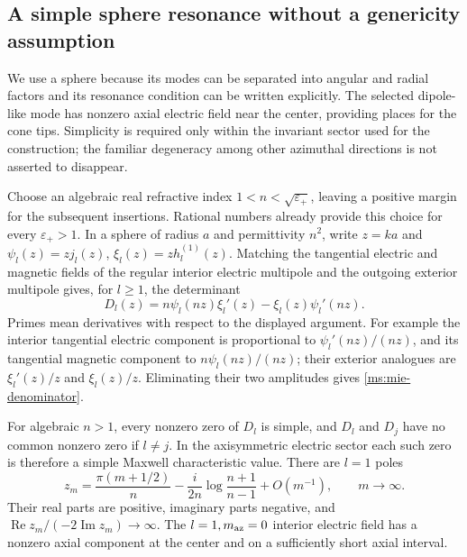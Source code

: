 \subsection{A simple sphere resonance without a genericity assumption}

We use a sphere because its modes can be separated into angular and
radial factors and its resonance condition can be written explicitly.
The selected dipole-like mode has nonzero axial electric field near the
center, providing places for the cone tips.  Simplicity is required only
within the invariant sector used for the construction; the familiar
degeneracy among other azimuthal directions is not asserted to disappear.

Choose an algebraic real refractive index
$1<n<\sqrt{\varepsilon_+}$, leaving a positive margin for the
subsequent insertions.  Rational numbers already provide this
choice for every $\varepsilon_+>1$.  In a sphere of radius $a$ and
permittivity $n^2$, write $z=ka$ and
$\psi_l(z)=zj_l(z)$, $\xi_l(z)=zh_l^{(1)}(z)$.
Matching the tangential electric and magnetic fields of the regular
interior electric multipole and the outgoing exterior multipole
gives, for $l\geq1$, the determinant
\begin{equation}
 D_l(z)=n\psi_l(nz)\xi_l'(z)-\xi_l(z)\psi_l'(nz).
 \label{ms:mie-denominator}
\end{equation}
Primes mean derivatives with respect to the displayed argument.
For example the interior tangential electric component is
proportional to $\psi_l'(nz)/(nz)$, and its tangential magnetic
component to $n\psi_l(nz)/(nz)$; their exterior analogues are
$\xi_l'(z)/z$ and $\xi_l(z)/z$.  Eliminating their two amplitudes
gives \eqref{ms:mie-denominator}.

\begin{lemma}
\label{ms:sphere-simple}
For algebraic $n>1$, every nonzero zero of $D_l$ is simple, and
$D_l$ and $D_j$ have no common nonzero zero if $l\ne j$.
In the axisymmetric electric sector each such zero is therefore a
simple Maxwell characteristic value.  There are $l=1$ poles
\begin{equation}
 z_m=\frac{\pi(m+1/2)}{n}
       -\frac{i}{2n}\log\frac{n+1}{n-1}+O(m^{-1}),
 \qquad m\longrightarrow\infty.
 \label{ms:pole-asymptotic}
\end{equation}
Their real parts are positive, imaginary parts negative, and
$\operatorname{Re}z_m/(-2\operatorname{Im}z_m)\to\infty$.
The $l=1,m_{\rm az}=0$ interior electric field has a nonzero axial
component at the center and on a sufficiently short axial interval.
\end{lemma}

